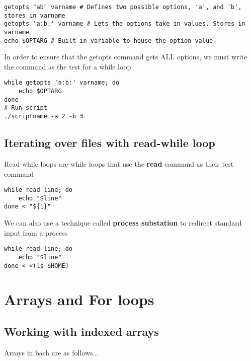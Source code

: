 \documentclass{report}
\begin{document}
    \begin{verbatim}
getopts "ab" varname # Defines two possible options, 'a', and 'b', stores in varname
getopts 'a:b:' varname # Lets the options take in values. Stores in varname
echo $OPTARG # Built in variable to house the option value
    \end{verbatim}
    \bigbreak \noindent
    
    \bigbreak \noindent 
    In order to ensure that the getopts command gets ALL options, we must write the command as the test for a while loop
    
    \begin{verbatim}
while getopts 'a:b:' varname; do 
    echo $OPTARG
done
# Run script
./scriptname -a 2 -b 3
    \end{verbatim}
    \bigbreak \noindent
    

    \pagebreak \bigbreak \noindent 
    \subsection{Iterating over files with read-while loop}
    \bigbreak \noindent 
    \begin{concept}
        Read-while loops are while loops that use the \textbf{read} command as their test command
    \end{concept}
    
    \begin{verbatim}
while read line; do
    echo "$line"
done < "${1}"
    \end{verbatim}
    \bigbreak \noindent
    
    \bigbreak \noindent 
    We can also use a technique called \textbf{process substation} to redirect standard input from a process
    
    \begin{verbatim}
while read line; do
    echo "$line"
done < <(ls $HOME)
    \end{verbatim}
    \bigbreak \noindent
    

    \pagebreak \bigbreak \noindent 
    \section{\LARGE Arrays and For loops}
    \bigbreak \noindent 
    \subsection{Working with indexed arrays}
    Arrays in bash are as follows...
    
\end{document}
